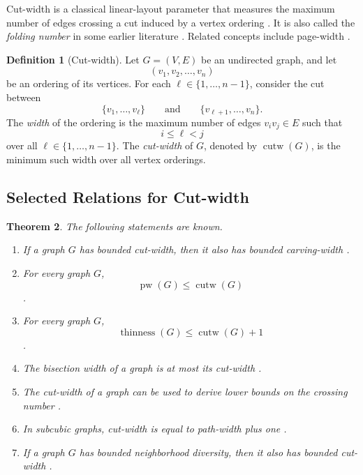 \documentclass[10pt]{book}
\newtheorem{theorem}{Theorem}[section]
\theoremstyle{definition}
\newtheorem{definition}[theorem]{Definition}
\DeclareMathOperator{\pw}{pw}
\DeclareMathOperator{\cutw}{cutw}
\DeclareMathOperator{\thinness}{thinness}
\begin{document}
Cut-width is a classical linear-layout parameter that measures the maximum number of edges crossing a cut induced by a vertex ordering \cite{279,280,281}.  
It is also called the \emph{folding number} in some earlier literature \cite{Chung1985ONTC}.  
Related concepts include page-width \cite{336}.

\begin{definition}[Cut-width]
Let \(G=(V,E)\) be an undirected graph, and let
\[
(v_1,v_2,\dots,v_n)
\]
be an ordering of its vertices.
For each \(\ell\in\{1,\dots,n-1\}\), consider the cut between
\[
\{v_1,\dots,v_\ell\}
\qquad\text{and}\qquad
\{v_{\ell+1},\dots,v_n\}.
\]
The \emph{width} of the ordering is the maximum number of edges \(v_iv_j\in E\) such that
\[
i\leq \ell < j
\]
over all \(\ell\in\{1,\dots,n-1\}\).
The \emph{cut-width} of \(G\), denoted by \(\cutw(G)\), is the minimum such width over all vertex orderings.
\end{definition}

\subsection{Selected Relations for Cut-width}

\begin{theorem}
The following statements are known.
\begin{enumerate}
    \item If a graph \(G\) has bounded cut-width, then it also has bounded carving-width \cite{326}.

    \item For every graph \(G\),
    \[
    \pw(G)\leq \cutw(G)
    \]
    \cite{321}.

    \item For every graph \(G\),
    \[
    \thinness(G)\leq \cutw(G)+1
      \]
    \cite{mannino2007stable,beisegel2024simultaneous}.

    \item The bisection width of a graph is at most its cut-width \cite{diaz2002survey}.

    \item The cut-width of a graph can be used to derive lower bounds on the crossing number \cite{334}.

    \item In subcubic graphs, cut-width is equal to path-width plus one \cite{335}.

    \item If a graph \(G\) has bounded neighborhood diversity, then it also has bounded cut-width \cite{363}.
\end{enumerate}
\end{theorem}
\end{document}

